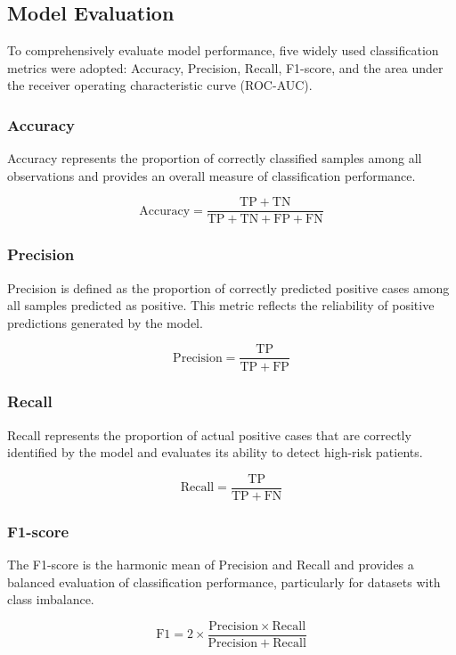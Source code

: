 \documentclass[12pt]{article}
\begin{document}
\subsection{Model Evaluation}

To comprehensively evaluate model performance, five widely used classification metrics were adopted: Accuracy, Precision, Recall, F1-score, and the area under the receiver operating characteristic curve (ROC-AUC). 

\subsubsection{Accuracy}

Accuracy represents the proportion of correctly classified samples among all observations and provides an overall measure of classification performance.

\[\mathrm{Accuracy=\frac{TP+TN}{TP+TN+FP+FN}}\]

\subsubsection{Precision}

Precision is defined as the proportion of correctly predicted positive cases among all samples predicted as positive. This metric reflects the reliability of positive predictions generated by the model.

\[\mathrm{Precision=\frac{TP}{TP+FP}}
\]

\subsubsection{Recall}

Recall represents the proportion of actual positive cases that are correctly identified by the model and evaluates its ability to detect high-risk patients.

\[\mathrm{Recall=\frac{TP}{TP+FN}}\]

\subsubsection{F1-score}

The F1-score is the harmonic mean of Precision and Recall and provides a balanced evaluation of classification performance, particularly for datasets with class imbalance.

\[\mathrm{F1=2×\frac{Precision×Recall}{Precision+Recall}}\]
\end{document}
